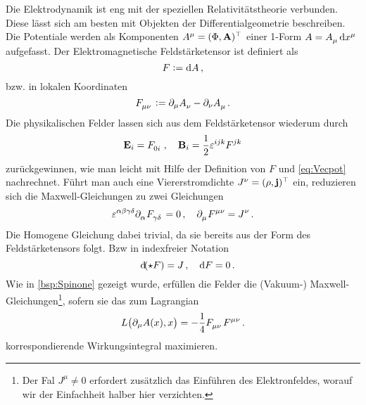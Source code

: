 Die Elektrodynamik ist eng mit der speziellen Relativitätstheorie verbunden.
Diese lässt sich am besten mit Objekten der Differentialgeometrie beschreiben.
Die Potentiale werden als Komponenten
$\tensor{A}{^\mu}=(\Phi,\vec{A})\transpose$ einer 1-Form
$A=\tensor{A}{_\mu}\dif\tensor{x}{^\mu}$ aufgefasst. Der Elektromagnetische Feldstärketensor ist definiert als
\begin{equation}
F:=\dif
A\,,
\end{equation}
bzw. in lokalen Koordinaten
\begin{equation}
\tensor{F}{_\mu_\nu}:=\partial_\mu\tensor{A}{_\nu}-\partial_\nu\tensor{A}{_\mu}\,.
\end{equation}
Die physikalischen Felder lassen sich aus dem Feldstärketensor wiederum durch 
\begin{equation}
\vec{E}_{i}=\tensor{F}{_0_i}\,,\quad
\vec{B}_i=\frac{1}{2}\tensor{\varepsilon}{^i^j^k}\tensor{F}{^j^k}
\end{equation}
zurückgewinnen, wie man leicht mit Hilfe der Definition von $F$ und
\eqref{eq:Vecpot} nachrechnet. Führt man auch eine Viererstromdichte
$\tensor{J}{^\nu}=(\rho,\vec{j})\transpose$ ein, reduzieren sich die Maxwell-Gleichungen zu zwei
Gleichungen
\begin{equation}
\tensor{\varepsilon}{^\alpha^\beta^\gamma^\delta}
\pdif{_{\alpha}}\tensor{F}{_\gamma_{\delta}}=0\,,\quad
\pdif{_\mu}\tensor{F}{^\mu^\nu}=\tensor{J}{^\nu}\,.
\end{equation}
Die Homogene Gleichung dabei trivial, da sie bereits aus der Form des
Feldstärketensors folgt.
Bzw in indexfreier Notation
\begin{equation}
\quad \dif(\star F)= J\,,\quad\dif F = 0\,.
\end{equation}
Wie in \autoref{bsp:Spinone} gezeigt wurde, erfüllen die Felder die (Vakuum-)
Maxwell-Gleichungen\footnote{Der Fal $J^\mu\neq 0$ erfordert zusätzlich das
Einführen des Elektronfeldes, worauf wir der Einfachheit halber hier
verzichten.}, sofern sie das zum Lagrangian
 \begin{equation}
L\left(\partial_\mu
A(x),x\right)=-\frac{1}{4}\tensor{F}{_\mu_\nu}\tensor{F}{^\mu^\nu} \,.
 \end{equation}
korrespondierende Wirkungsintegral maximieren.
